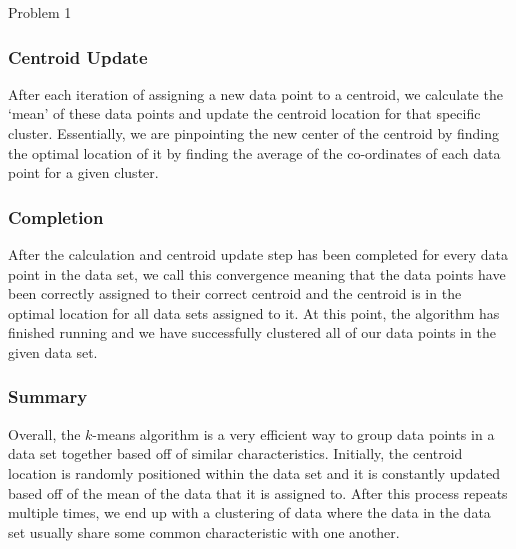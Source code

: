 \begin{problem}{Problem 1}
\begin{highlight}[Solution]
        \subsubsection*{Centroid Update}

        After each iteration of assigning a new data point to a centroid, we calculate the `mean' of these data points and update the centroid location for that specific cluster. Essentially, we are pinpointing
        the new center of the centroid by finding the optimal location of it by finding the average of the co-ordinates of each data point for a given cluster. \vspace*{1em}

        \subsubsection*{Completion}

        After the calculation and centroid update step has been completed for every data point in the data set, we call this convergence meaning that the data points have been correctly assigned to their
        correct centroid and the centroid is in the optimal location for all data sets assigned to it. At this point, the algorithm has finished running and we have successfully clustered all of our data points
        in the given data set. \vspace*{1em}

        \subsubsection*{Summary}

        Overall, the $k$-means algorithm is a very efficient way to group data points in a data set together based off of similar characteristics. Initially, the centroid location is randomly positioned within
        the data set and it is constantly updated based off of the mean of the data that it is assigned to. After this process repeats multiple times, we end up with a clustering of data where the data in the data
        set usually share some common characteristic with one another.
    \end{highlight}
\end{problem}

